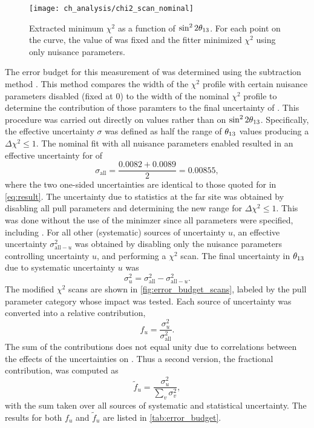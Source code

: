 \begin{figure}
    \centering
    \texttt{[image: ch\_analysis/chi2\_scan\_nominal]}
    \caption{
        Extracted minimum $\chi^2$ as a function of $\sin^22\theta_{13}$.
        For each point on the curve, the value of \thetaot{} was fixed
        and the fitter minimized $\chi^2$
        using only nuisance parameters.
    }
    \label{fig:chi2_scan}
\end{figure}

The error budget for this measurement of \thetaot{}
was determined using the subtraction method \cite{nh2016technote}.
This method compares the width of the $\chi^2$ profile
with certain nuisance parameters disabled (fixed at 0)
to the width of the nominal $\chi^2$ profile
to determine the contribution of those paramters
to the final uncertainty of \thetaot{}.
This procedure was carried out directly on \thetaot{} values
rather than on $\sin^22\theta_{13}$.
Specifically, the effective uncertainty $\sigma$
was defined as half the range of $\theta_{13}$ values
producing a $\Delta \chi^2 \leq 1$.
The nominal fit with all nuisance parameters enabled
resulted in an effective uncertainty for \thetaot{} of
\begin{equation}\label{eq:nominal_unc}
    \sigma_\text{all} = \frac{0.0082 + 0.0089}{2} = 0.00855,
\end{equation}
where the two one-sided uncertainties are identical
to those quoted for \thetaot{} in \cref{eq:result}.
The uncertainty due to statistics at the far site was obtained
by disabling all pull parameters
and determining the new range for $\Delta \chi^2 \leq 1$.
This was done without the use of the minimzer since all parameters were specified,
including \thetaot{}.
For all other (systematic) sources of uncertainty $u$,
an effective uncertainty $\sigma^2_{\text{all}-u}$
was obtained by disabling only the nuisance parameters
controlling uncertainty $u$,
and performing a $\chi^2$ scan.
The final uncertainty in $\theta_{13}$ due to
systematic uncertainty $u$ was
\begin{equation}\label{eq:syst_error_budget}
    \sigma^2_u = \sigma^2_\text{all} - \sigma^2_{\text{all}-u}.
\end{equation}
The modified $\chi^2$ scans are shown in \cref{fig:error_budget_scans},
labeled by the pull parameter category whose impact was tested.
Each source of uncertainty was converted into a relative contribution,
\begin{equation}\label{eq:syst_error_rel}
    f_u = \frac{\sigma^2_u}{\sigma^2_{\text{all}}}.
\end{equation}
The sum of the contributions does not equal unity
due to correlations between the effects of the uncertainties
on \thetaot{}.
Thus a second version, the fractional contribution, was computed as
\begin{equation}\label{eq:syst_error_frac}
    \tilde{f}_u = \frac{\sigma^2_u}{\sum_v \sigma^2_v},
\end{equation}
with the sum taken over all sources of systematic and statistical uncertainty.
The results for both $f_u$ and $\tilde{f}_u$ are
listed in \cref{tab:error_budget}.


